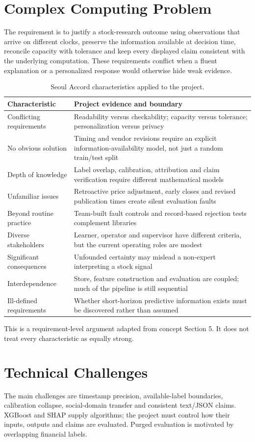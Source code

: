 \section{Complex Computing Problem}
The requirement is to justify a stock-research outcome using observations that arrive on different clocks, preserve the information available at decision time, reconcile capacity with tolerance and keep every displayed claim consistent with the underlying computation. These requirements conflict when a fluent explanation or a personalized response would otherwise hide weak evidence.
\begin{longtable}{p{}p{}}
\caption{Seoul Accord characteristics applied to the project.}\label{tab:ccp}\\\toprule Characteristic & Project evidence and boundary\\\midrule
Conflicting requirements & Readability versus checkability; capacity versus tolerance; personalization versus privacy\\
No obvious solution & Timing and vendor revisions require an explicit information-availability model, not just a random train/test split\\
Depth of knowledge & Label overlap, calibration, attribution and claim verification require different mathematical models\\
Unfamiliar issues & Retroactive price adjustment, early closes and revised publication times create silent evaluation faults\\
Beyond routine practice & Team-built fault controls and record-based rejection tests complement libraries\\
Diverse stakeholders & Learner, operator and supervisor have different criteria, but the current operating roles are modest\\
Significant consequences & Unfounded certainty may mislead a non-expert interpreting a stock signal\\
Interdependence & Store, feature construction and evaluation are coupled; much of the pipeline is still sequential\\
Ill-defined requirements & Whether short-horizon predictive information exists must be discovered rather than assumed\\
\bottomrule\end{longtable}
This is a requirement-level argument adapted from concept Section 5. It does not treat every characteristic as equally strong.
\section{Technical Challenges}
The main challenges are timestamp precision, available-label boundaries, calibration collapse, social-domain transfer and consistent text/JSON claims. XGBoost\cite{xgboost_2016} and SHAP\cite{shap_2017,treeshap_paper} supply algorithms; the project must control how their inputs, outputs and claims are evaluated. Purged evaluation is motivated by overlapping financial labels\cite{deprado_2018}.
